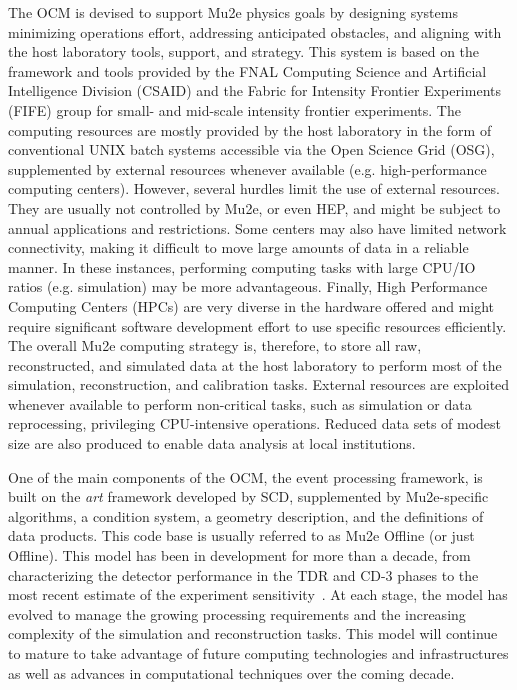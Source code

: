 
The OCM is devised to support Mu2e physics goals by designing systems minimizing operations effort, addressing anticipated obstacles, and aligning with the host laboratory tools, support, and strategy. This system is based on the framework and tools provided by the FNAL Computing Science and Artificial Intelligence Division (CSAID) and the Fabric for Intensity Frontier Experiments (FIFE) group for small- and mid-scale intensity frontier experiments. The computing resources are mostly provided by the host laboratory in the form of conventional UNIX batch systems accessible via the Open Science Grid (OSG), supplemented by external resources whenever available (e.g. high-performance computing centers). However, several hurdles limit the use of external resources. They are usually not controlled by Mu2e, or even HEP, and might be subject to annual applications and restrictions. Some centers may also have limited network connectivity, making it difficult to move large amounts of data in a reliable manner. In these instances, performing computing tasks with large CPU/IO ratios (e.g. simulation) may be more advantageous. Finally, High Performance Computing Centers (HPCs) are very diverse in the hardware offered and might require significant software development effort to use specific resources efficiently. The overall Mu2e computing strategy is, therefore, to store all raw, reconstructed, and simulated data at the host laboratory to perform most of the simulation, reconstruction, and calibration tasks. External resources are exploited whenever available to perform non-critical tasks, such as simulation or data reprocessing, privileging CPU-intensive operations. Reduced data sets of modest size are also produced to enable data analysis at local institutions. 

One of the main components of the OCM, the event processing framework, is built on the {\it art} framework developed by SCD, supplemented by Mu2e-specific algorithms, a condition system, a geometry description, and the definitions of data products. This code base is usually referred to as Mu2e Offline (or just Offline). This model has been in development for more than a decade, from characterizing the detector performance in the TDR and CD-3 phases to the most recent estimate of the experiment sensitivity~\cite{Mu2e:2022ggl}. At each stage, the model has evolved to manage the growing processing requirements and the increasing complexity of the simulation and reconstruction tasks. This model will continue to mature to take advantage of future computing technologies and infrastructures as well as advances in computational techniques over the coming decade. 


